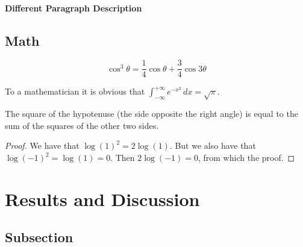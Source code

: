 \documentclass[
10pt, %
a4paper, %
oneside, %
headinclude,footinclude, %
BCOR5mm, %
]{scrartcl}
\begin{document}
\paragraph{Different Paragraph Description} \lipsum[8] %


\subsection{Math}

\lipsum[4] %

\begin{equation}
\cos^3 \theta =\frac{1}{4}\cos\theta+\frac{3}{4}\cos 3\theta
\label{eq:refname2}
\end{equation}

\lipsum[5] %

\begin{definition}[Gauss] 
To a mathematician it is obvious that
$\int_{-\infty}^{+\infty}
e^{-x^2}\,dx=\sqrt{\pi}$. 
\end{definition} 

\begin{theorem}[Pythagoras]
The square of the hypotenuse (the side opposite the right angle) is equal to the sum of the squares of the other two sides.
\end{theorem}

\begin{proof} 
We have that $\log(1)^2 = 2\log(1)$.
But we also have that $\log(-1)^2=\log(1)=0$.
Then $2\log(-1)=0$, from which the proof.
\end{proof}


\section{Results and Discussion}

\lipsum[10] %


\subsection{Subsection}
\end{document}
